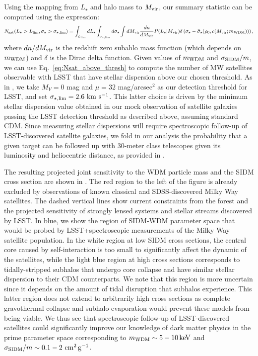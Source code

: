 Using the mapping from $L_\star$ and halo mass to $M_{\rm vir}$, our summary statistic can be computed using the expression:
\begin{equation}\label{eq:Nsat_above_thresh}
 N_{\rm sat}(L_\star>L_{\rm lim}, \sigma_\star> \sigma_{\star,\rm lim}) =  \int_{L_{\rm lim}} dL_\star \int_{\sigma_{\star,\rm lim}} d\sigma_\star \int dM_{\rm vir} \frac{dn}{d M_{\rm vir}} P(L_\star|M_{\rm vir})
 \delta\left(\sigma_\star-\bar{\sigma}_\star(\rho_0,c(M_{\rm vir};m_{\rm WDM}))\right),
\end{equation}
where $dn/dM_{\rm vir}$ is the redshift zero subahlo mass function (which depends on $m_{\rm WDM}$) and $\delta$ is the Dirac delta function. Given values of $m_{\rm WDM}$ and $\sigma_{\rm SIDM}/m$, we can use Eq.~\eqref{eq:Nsat_above_thresh} to compute the number of MW satellites observable with LSST that have stellar dispersion above our chosen threshold. As in ,
we take $M_V=0$ mag and $\mu=32$ mag/arcsec$^2$ as our detection threshold for LSST, and set $\sigma_{\star,\rm lim}=2.6 \mathrm{\,\mathrm{\,km}\,\mathrm{\,s}^{-1}}$. This latter choice is driven by the minimum stellar dispersion value obtained in our mock observation of satellite galaxies passing the LSST detection threshold as described above, assuming standard CDM. Since measuring stellar dispersions will require spectroscopic follow-up of LSST-discovered satellite galaxies, we fold in our analysis the probability that a given target can be followed up with 30-meter class telescopes given its luminosity and heliocentric distance, as provided in .

The resulting projected joint sensitivity to the WDM particle mass and the SIDM cross section are shown in . 
The red region to the left of the figure is already excluded by observations of known classical and SDSS-discovered Milky Way satellites. 
The dashed vertical lines show current constraints from the \Lya forest \citep{2017PhRvD..96b3522I} and the projected sensitivity of strongly lensed systems and stellar streams discovered by LSST.
In blue, we show the region of SIDM-WDM parameter space that would be probed by LSST+spectroscopic measurements of the Milky Way satellite population. 
In the white region at low SIDM cross sections, the central core caused by self-interaction is too small to significantly affect the dynamic of the satellites, while the light blue region at high cross sections corresponds to tidally-stripped subhalos that undergo core collapse and have similar stellar dispersion to their CDM counterparts. We note that this region is more uncertain since it depends on the amount of tidal disruption that subhalos experience. This latter region does not extend to arbitrarily high cross sections as complete gravothermal collapse and subhalo evaporation would prevent these models from being viable.  We thus see that spectroscopic follow-up of LSST-discovered satellites could significantly improve our knowledge of dark matter physics in the prime parameter space corresponding to $m_{\rm WDM} \sim 5-10 \mathrm{\,keV}$ and $\sigma_{\rm SIDM}/m \sim 0.1-2 \mathrm{\,\mathrm{\,cm}^2\mathrm{\,g}^{-1}}$.
